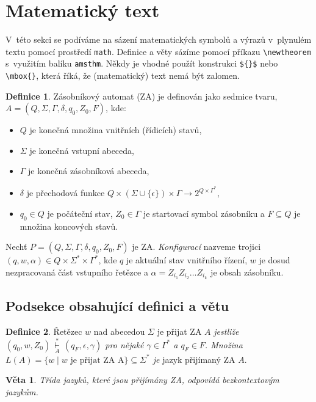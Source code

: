 \documentclass[twocolumn,a4paper,11pt]{article}
\theoremstyle{definition}
\newtheorem{definice}{Definice}[]
\theoremstyle{plain}
\newtheorem{veta}{Věta}
\begin{document}
\section{Matematický text}
\label{sec:mattext}
V~této sekci se podíváme na sázení matematických symbolů a výrazů v~plynulém textu pomocí prostředí \verb|math|.
Definice a věty sázíme pomocí příkazu \verb|\newtheorem| s~využitím balíku \verb|amsthm|.
Někdy je vhodné použít konstrukci \verb|${}$| nebo \verb|\mbox{}|, která říká, že (matematický) text nemá být zalomen.
\begin{definice}\label{def:ZA} Zásobníkový automat (ZA) je definován jako sedmice tvaru, $A = (Q, \Sigma, \Gamma, \delta, q_0 , Z_0 , F)$, kde: \begin{itemize} \item $Q$ je konečná množina vnitřních (řídicích) stavů, \item $\Sigma$ je konečná vstupní abeceda, \item $\Gamma$ je konečná zásobníková abeceda, \item $\delta$ je přechodová funkce $Q \times (\Sigma \cup \{\epsilon\}) \times \Gamma \rightarrow 2^{Q \times \Gamma^*}$, \item $q_0 \in Q$ je počáteční stav, $Z_0 \in \Gamma$ je startovací symbol zásobníku a $F \subseteq Q$ je množina koncových stavů.\end{itemize}
\par Nechť $P = (Q,\Sigma,\Gamma,\delta,q_0,Z_0,F)$ je ZA. \emph{Konfigurací} nazveme trojici $(q,w,\alpha) \in Q \times \Sigma^*\times \Gamma^*$, kde $q$ je aktuální stav vnitřního řízení, $w$ je dosud nezpracovaná část vstupního řetězce a $\alpha = Z_{i_1}Z_{i_2}\dots Z_{i_k}$ je obsah zásobníku.
\end{definice}

\subsection{Podsekce obsahující definici a větu}
\begin{definice}\label{def:retezec} Řetězec $w$ nad abecedou $\Sigma$ je přijat ZA $A$ \textit{jestliže $(q_0,w,Z_0)\,\underset{A}{\overset{*}{\vdash}}\,(q_F,\epsilon,\gamma)$ pro nějaké $\gamma \in \Gamma^*$ a $q_F \in F$. Množina $L(A) = \{w \mid w \text{ je přijat ZA A}\} \subseteq \Sigma^*$ je} jazyk přijímaný ZA $A$.\end{definice}

\begin{veta}Třída jazyků, které jsou přijímány ZA, odpovídá bezkontextovým jazykům.\end{veta}
\end{document}
